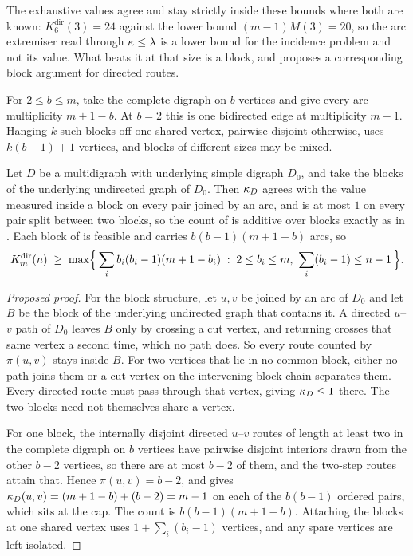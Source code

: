 The exhaustive values agree and stay strictly inside these bounds where both are known:
$K_6^{\mathrm{dir}}(3) = 24$ against the lower bound $(m-1)M(3) = 20$, so the arc
extremiser read through $\kappa \le \lambda$ is a lower bound for the incidence problem and
not its value. What beats it at that size is a block, and  proposes a corresponding block argument for directed routes.

\begin{construction}\label{const:dir-multi-vertex-blocks}
For $2 \le b \le m$, take the complete digraph on $b$ vertices and give every arc
multiplicity $m+1-b$. At $b=2$ this is one bidirected edge at multiplicity $m-1$.
Hanging $k$ such blocks off one shared vertex, pairwise disjoint otherwise, uses
$k(b-1)+1$ vertices, and blocks of different sizes may be mixed.
\end{construction}

\begin{conjecture}\label{prop:dir-multi-vertex-blocks}
Let $D$ be a multidigraph with underlying simple digraph $D_0$, and take the blocks of
the underlying undirected graph of $D_0$. Then $\kappa_D$ agrees with the value measured
inside a block on every pair joined by an arc, and is at most $1$ on every pair split
between two blocks, so the count of  is additive over
blocks exactly as in . Each block of
 is feasible and carries $b(b-1)(m+1-b)$ arcs, so
\[
    K_m^{\mathrm{dir}}(n) \;\ge\; \max\Bigl\{\, \sum_i b_i(b_i-1)(m+1-b_i)
      \;:\; 2 \le b_i \le m,\ \sum_i (b_i - 1) \le n-1 \,\Bigr\} .
\]
\end{conjecture}

\begin{proof}[Proposed proof]
For the block structure, let $u,v$ be joined by an arc of $D_0$ and let $B$ be the block
of the underlying undirected graph that contains it. A directed $u$--$v$ path of $D_0$
leaves $B$ only by crossing a cut vertex, and returning crosses that same vertex a
second time, which no path does. So every route counted by $\pi(u,v)$ stays inside $B$.
For two vertices that lie in no common block, either no path joins them or a
cut vertex on the intervening block chain separates them. Every directed
route must pass through that vertex, giving $\kappa_D \le 1$ there. The two
blocks need not themselves share a vertex.

For one block, the internally disjoint directed $u$--$v$ routes of length at least two
in the complete digraph on $b$ vertices have pairwise disjoint interiors drawn from the
other $b-2$ vertices, so there are at most $b-2$ of them, and the two-step routes attain
that. Hence $\pi(u,v) = b-2$, and  gives
$\kappa_D(u,v) = (m+1-b) + (b-2) = m-1$ on each of the $b(b-1)$ ordered pairs, which sits
at the cap. The count is $b(b-1)(m+1-b)$. Attaching the blocks at one shared vertex uses
$1 + \sum_i (b_i-1)$ vertices, and any spare vertices are left isolated.
\end{proof}


